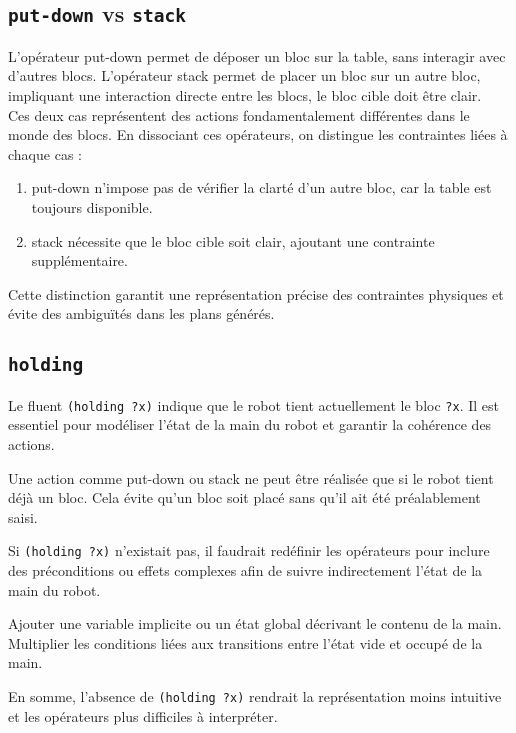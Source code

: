 \documentclass[../CSC_5RO16_TA_TP5.tex]{subfiles}
\begin{document}
\subsection{\texttt{put-down} vs \texttt{stack}}
\noindent L'opérateur put-down permet de déposer un bloc sur la table, sans interagir avec d'autres blocs. L'opérateur stack permet de placer un bloc sur un autre bloc, impliquant une interaction directe entre les blocs, le bloc cible doit être clair.\\

\noindent Ces deux cas représentent des actions fondamentalement différentes dans le monde des blocs. En dissociant ces opérateurs, on distingue les contraintes liées à chaque cas :
\begin{enumerate}[noitemsep]
    \item put-down n'impose pas de vérifier la clarté d'un autre bloc, car la table est toujours disponible.
    \item stack nécessite que le bloc cible soit clair, ajoutant une contrainte supplémentaire.
\end{enumerate}
\noindent Cette distinction garantit une représentation précise des contraintes physiques et évite des ambiguïtés dans les plans générés.

\subsection{\texttt{holding}}
\noindent Le fluent \texttt{(holding ?x)} indique que le robot tient actuellement le bloc \texttt{?x}. Il est essentiel pour modéliser l'état de la main du robot et garantir la cohérence des actions.
\begin{example}
    Une action comme put-down ou stack ne peut être réalisée que si le robot tient déjà un bloc. Cela évite qu'un bloc soit placé sans qu'il ait été préalablement saisi.
\end{example}
\noindent Si \texttt{(holding ?x)} n'existait pas, il faudrait redéfinir les opérateurs pour inclure des préconditions ou effets complexes afin de suivre indirectement l'état de la main du robot.
\begin{example}
    Ajouter une variable implicite ou un état global décrivant le contenu de la main. Multiplier les conditions liées aux transitions entre l'état vide et occupé de la main.
\end{example}
\noindent En somme, l'absence de \texttt{(holding ?x)} rendrait la représentation moins intuitive et les opérateurs plus difficiles à interpréter.
\end{document}

